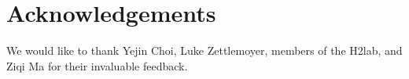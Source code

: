 \section*{Acknowledgements}
\label{sec:ack}

We would like to thank Yejin Choi, Luke Zettlemoyer, members of the H2lab, and Ziqi Ma for their invaluable feedback.
